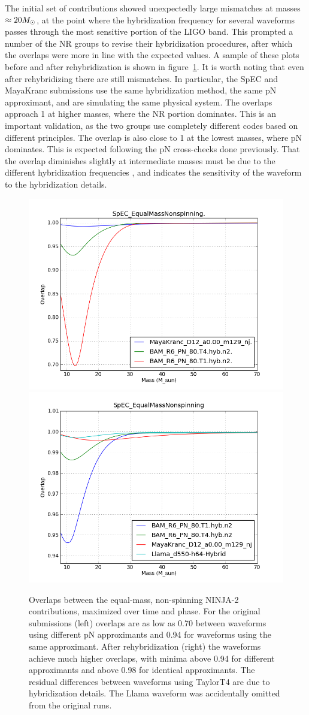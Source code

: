 The initial set of contributions showed unexpectedly large mismatches
at masses $\approx 20 M_\odot$, at the point where the hybridization
frequency for several waveforms passes through the most sensitive
portion of the LIGO band.  This prompted a number of the NR groups to
revise their hybridization procedures, after which the overlaps were
more in line with the expected values.  A sample of these plots before
and after rehybridization is shown in
figure~\ref{f:ninja2_overlap_test}.  It is worth noting that even
after rehybridizing there are still mismatches.  In particular, the
SpEC and MayaKranc submissions use the same hybridization method, the
same pN approximant, and are simulating the same physical system.  The
overlaps approach 1 at higher masses, where the NR portion dominates.
This is an important validation, as the two groups use completely
different codes based on different principles.  The overlap is also
close to 1 at the lowest masses, where pN dominates.  This is expected
following the pN cross-checks done previously.  That the overlap
diminishes slightly at intermediate masses must be due to the
different hybridization frequencies , and
indicates the sensitivity of the waveform to the hybridization
details.


\begin{figure}
  \includegraphics[width=0.5\linewidth]{figures/ninja2/q_1_z_0_figure03}
  \includegraphics[width=0.5\linewidth]{figures/ninja2/figure2_1_0_16}
  \caption[Overlaps between NINJA-2 submissions maximized over time
and phase]{
  \label{f:ninja2_overlap_test}
Overlaps between the equal-mass, non-spinning NINJA-2 contributions,
maximized over time and phase.   For the original submissions (left)
overlaps are as low as 0.70 between waveforms using different pN
approximants and 0.94 for waveforms using the same approximant.  After
rehybridization (right) the waveforms achieve much higher overlaps,
with minima above 0.94 for different approximants and above 0.98 for
identical approximants.  The residual differences  between waveforms
using TaylorT4 are due to hybridization details.  The Llama waveform
was accidentally omitted from the original runs.}
\end{figure}%

